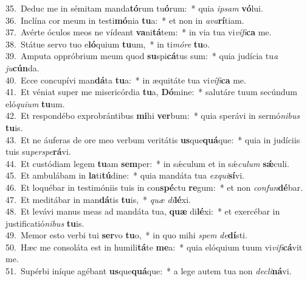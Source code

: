 {35.~}Deduc me in sémitam manda\textbf{tó}rum tu\textbf{ó}rum:~* quia \textit{i}\textit{psam} \textbf{vó}lui.\\
{36.~}Inclína cor meum in testi\textbf{mó}nia \textbf{tu}a:~* et non in \textit{a}\textit{va}\textbf{rí}tiam.\\
{37.~}Avérte óculos meos ne vídeant \textbf{va}ni\textbf{tá}tem:~* in via tua vi\textit{ví}\textit{fi}\textbf{ca} me.\\
{38.~}Státue servo tuo e\textbf{ló}quium \textbf{tu}um,~* in ti\textit{mó}\textit{re} \textbf{tu}o.\\
{39.~}Amputa oppróbrium meum quod \textbf{su}spi\textbf{cá}tus sum:~* quia judícia tu\textit{a} \textit{ju}\textbf{cún}da.\\
{40.~}Ecce concupívi man\textbf{dá}ta \textbf{tu}a:~* in æquitáte tua vi\textit{ví}\textit{fi}\textbf{ca} me.\\
{41.~}Et véniat super me misericórdia \textbf{tu}a, \textbf{Dó}mine:~* salutáre tuum secúndum eló\textit{qui}\textit{um} \textbf{tu}um.\\
{42.~}Et respondébo exprobrántibus \textbf{mi}hi \textbf{ver}bum:~* quia sperávi in sermó\textit{ni}\textit{bus} \textbf{tu}is.\\
{43.~}Et ne áuferas de ore meo verbum veritátis \textbf{us}que\textbf{quá}que:~* quia in judíciis tuis su\textit{per}\textit{spe}\textbf{rá}vi.\\
{44.~}Et custódiam legem \textbf{tu}am \textbf{sem}per:~* in sǽculum et in sǽ\textit{cu}\textit{lum} \textbf{sǽ}culi.\\
{45.~}Et ambulábam in \textbf{la}ti\textbf{tú}dine:~* quia mandáta tua \textit{ex}\textit{qui}\textbf{sí}vi.\\
{46.~}Et loquébar in testimóniis tuis in con\textbf{spé}ctu \textbf{re}gum:~* et non \textit{con}\textit{fun}\textbf{dé}bar.\\
{47.~}Et meditábar in man\textbf{dá}tis \textbf{tu}is,~* \textit{quæ} \textit{di}\textbf{lé}xi.\\
{48.~}Et levávi manus meas ad mandáta tua, \textbf{quæ} di\textbf{lé}xi:~* et exercébar in justificatió\textit{ni}\textit{bus} \textbf{tu}is.\\
{49.~}Memor esto verbi tui \textbf{ser}vo \textbf{tu}o,~* in quo mihi \textit{spem} \textit{de}\textbf{dí}sti.\\
{50.~}Hæc me consoláta est in humili\textbf{tá}te \textbf{me}a:~* quia elóquium tuum vi\textit{vi}\textit{fi}\textbf{cá}vit me.\\
{51.~}Supérbi iníque agébant \textbf{us}que\textbf{quá}que:~* a lege autem tua non \textit{de}\textit{cli}\textbf{ná}vi.\\
